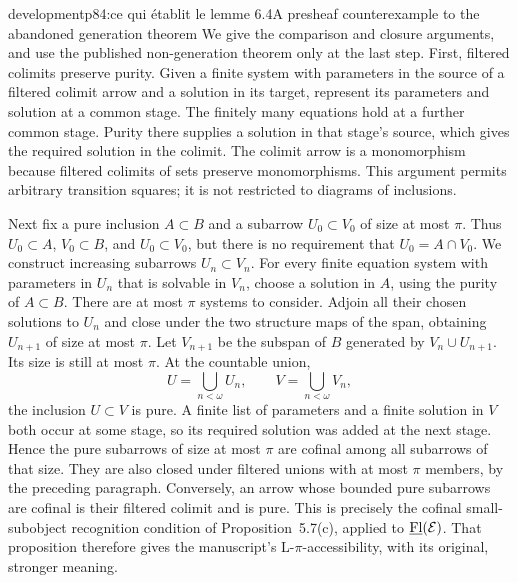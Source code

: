 \begin{dcomment}{development}{p84:ce qui établit le lemme 6.4}{A presheaf counterexample to the abandoned generation theorem}
We give the comparison and closure arguments, and use the published non-generation theorem only at the last step. First, filtered colimits preserve purity. Given a finite system with parameters in the source of a filtered colimit arrow and a solution in its target, represent its parameters and solution at a common stage. The finitely many equations hold at a further common stage. Purity there supplies a solution in that stage's source, which gives the required solution in the colimit. The colimit arrow is a monomorphism because filtered colimits of sets preserve monomorphisms. This argument permits arbitrary transition squares; it is not restricted to diagrams of inclusions.

Next fix a pure inclusion $A\subset B$ and a subarrow $U_0\subset V_0$ of size at most $\pi$. Thus $U_0\subset A$, $V_0\subset B$, and $U_0\subset V_0$, but there is no requirement that $U_0=A\cap V_0$. We construct increasing subarrows $U_n\subset V_n$. For every finite equation system with parameters in $U_n$ that is solvable in $V_n$, choose a solution in $A$, using the purity of $A\subset B$. There are at most $\pi$ systems to consider. Adjoin all their chosen solutions to $U_n$ and close under the two structure maps of the span, obtaining $U_{n+1}$ of size at most $\pi$. Let $V_{n+1}$ be the subspan of $B$ generated by $V_n\cup U_{n+1}$. Its size is still at most $\pi$. At the countable union,
\[
U=\bigcup_{n<\omega}U_n,\qquad V=\bigcup_{n<\omega}V_n,
\]
the inclusion $U\subset V$ is pure. A finite list of parameters and a finite solution in $V$ both occur at some stage, so its required solution was added at the next stage. Hence the pure subarrows of size at most $\pi$ are cofinal among all subarrows of that size. They are also closed under filtered unions with at most $\pi$ members, by the preceding paragraph. Conversely, an arrow whose bounded pure subarrows are cofinal is their filtered colimit and is pure. This is precisely the cofinal small-subobject recognition condition of Proposition~5.7(c), applied to $\underline{\mathrm{Fl}}(\mathcal E)$. That proposition therefore gives the manuscript's L-$\pi$-accessibility, with its original, stronger meaning.


\end{dcomment}
